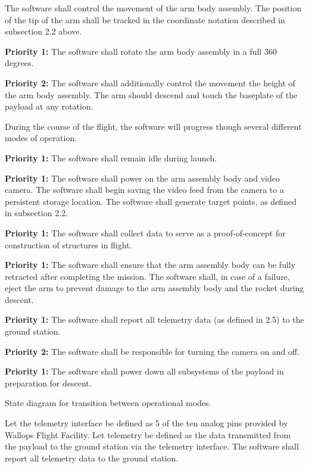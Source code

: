 The software shall control the movement of the arm body assembly. 
The position of the tip of the arm shall be tracked in the coordinate notation described in subsection 2.2 above.

\textbf{Priority 1:}
The software shall rotate the arm body assembly in a full 360 degrees.

\textbf{Priority 2:}
The software shall additionally control the movement the height of the arm body assembly.
The arm should descend and touch the baseplate of the payload at any rotation.

During the course of the flight, the software will progress though several different modes of operation.

\textbf{Priority 1:}
The software shall remain idle during launch.

\textbf{Priority 1:}
The software shall power on the arm assembly body and video camera.
The software shall begin saving the video feed from the camera to a persistent storage location.
The software shall generate target points, as defined in subsection 2.2.

\textbf{Priority 1:}
The software shall collect data to serve as a proof-of-concept for construction of structures in flight.

\textbf{Priority 1:}
The software shall ensure that the arm assembly body can be fully retracted after completing the mission.
The software shall, in case of a failure, eject the arm to prevent damage to the arm assembly body and the rocket during descent.

\textbf{Priority 1:}
The software shall report all telemetry data (as defined in 2.5) to the ground station.

\textbf{Priority 2:}
The software shall be responsible for turning the camera on and off.

\textbf{Priority 1:}
The software shall power down all subsystems of the payload in preparation for descent.


\begin{center}
State diagram for transition between operational modes.
\end{center}

Let the telemetry interface be defined as 5 of the ten analog pins provided by Wallops Flight Facility.
Let telemetry be defined as the data transmitted from the payload to the ground station via the telemetry interface.
The software shall report all telemetry data to the ground station.

